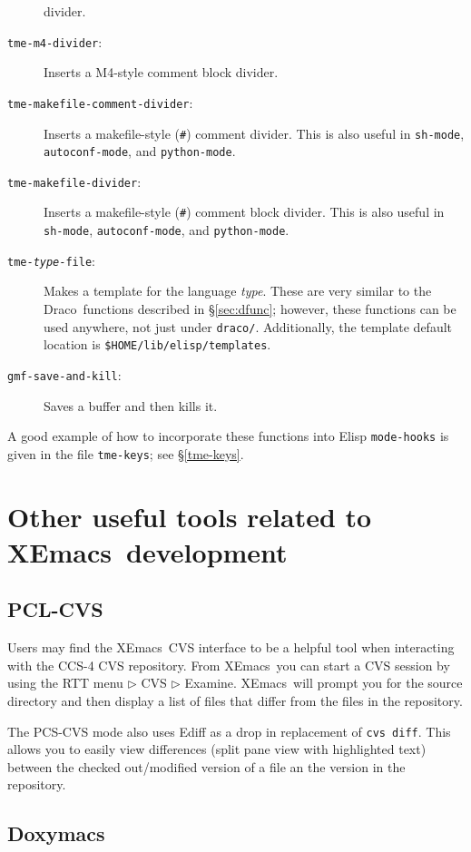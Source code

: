 \documentclass[11pt]{nmemo}
\newcommand{\comp}[1]{{\normalfont\texttt{\footnotesize{#1}}}}
\newcommand{\draco}{{\normalfont\sffamily Draco}}
\newcommand{\xemacs}{{\normalfont\sffamily XEmacs}}
\begin{document}
\begin{description}
  divider.
\item[\comp{tme-m4-divider}:] Inserts a M4-style comment block
  divider.
\item[\comp{tme-makefile-comment-divider}:] Inserts a makefile-style
  (\comp{\#}) comment divider.  This is also useful in \comp{sh-mode},
  \comp{autoconf-mode}, and \comp{python-mode}.
\item[\comp{tme-makefile-divider}:] Inserts a makefile-style
  (\comp{\#}) comment block divider. This is also useful in
  \comp{sh-mode}, \comp{autoconf-mode}, and \comp{python-mode}.
\item[\comp{tme-\textsl{type}-file}:] Makes a template for the
  language \textsl{type}.  These are very similar to the \draco\ 
  functions described in \S\ref{sec:dfunc}; however, these functions
  can be used anywhere, not just under \comp{draco/}.  Additionally,
  the template default location is \comp{\$HOME/lib/elisp/templates}.
\item[\comp{gmf-save-and-kill}:]  Saves a buffer and then kills it.
\end{description}  
A good example of how to incorporate these functions into Elisp
\comp{mode-hooks} is given in the file \comp{tme-keys}; see
\S\ref{tme-keys}.

\section{Other useful tools related to \xemacs\ development}
\label{sec:othertools}

\subsection{PCL-CVS}
\label{sec:pclcvs}

Users may find the \xemacs\ CVS interface to be a helpful tool when
interacting with the CCS-4 CVS repository.  From \xemacs\ you can
start a CVS session by using the RTT menu $\triangleright$ CVS
$\triangleright$ Examine.  \xemacs\ will prompt you for the source
directory and then display a list of files that differ from the files
in the repository.

The PCS-CVS mode also uses Ediff as a drop in replacement of \comp{cvs
  diff}.  This allows you to easily view differences (split pane view
with highlighted text) between the checked out/modified version of a
file an the version in the repository.

\subsection{Doxymacs}
\label{sec:doxymacs}
\end{document}
